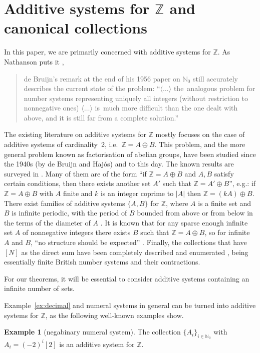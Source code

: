 \documentclass[12pt]{article}
\theoremstyle{definition}
\newtheorem{example}{Example}
\newcommand{\N}{\mathbb{N}}
\newcommand{\Z}{\mathbb{Z}}
\begin{document}
\section{Additive systems for $\Z$ and canonical collections}
\label{sec:canonical}
In this paper, we are primarily concerned with additive systems for $\Z$.
As Nathanson puts it \cite{Nathanson}, 
\begin{quote}
de Bruijn's remark at the end of his 1956 paper on $\N_0$ still accurately describes the current state of the problem: ``$\langle\ldots\rangle$ the~analog\-ous problem for number systems representing uniquely all integers (without restriction to nonnegative ones) $\langle\ldots\rangle$ is~much more difficult than the one dealt with above, and it is still far from a complete solution.''
\end{quote}

The existing literature on additive systems for $\Z$ mostly focuses on the case of additive systems of cardinality~2, i.e.\ $\Z=A\oplus B$. This problem, and the more general problem known as factorisation of abelian groups, have been studied since the 1940s (by de Bruijn and Haj\'os) and to this day. The known results are surveyed in \cite{book:SzaboSands}. Many of them are of the form ``if $\Z=A\oplus B$ and $A,B$ satisfy certain conditions, then there exists another set $A'$ such that $\Z=A'\oplus B$'', e.g.: if $\Z=A\oplus B$ with $A$ finite and $k$ is an integer coprime to $|A|$ then $\Z=(kA)\oplus B$. There exist families of additive systems $\{A,B\}$ for $\Z$, where $A$ is a finite set and $B$ is infinite periodic, with the period of $B$ bounded from above or from below in the terms of the diameter of $A$ \cite{book:SzaboSands}. It is known that for any sparse enough infinite set $A$ of nonnegative integers there exists $B$ such that $\Z=A\oplus B$, so for infinite $A$ and $B$, ``no structure should be expected'' \cite{book:ww}. Finally, the collections that have $[N]$ as the direct sum have been completely described and enumerated \cite{cardiff23}, being essentially finite British number systems and their contractions.

For our theorems, it will be essential to consider additive systems containing an infinite number of sets.

Example~\ref{ex:decimal} and numeral systems in general can be turned into additive systems for $\Z$, as the following well-known examples show.

\begin{example}[negabinary numeral system]
\label{ex:-bin}
The collection $\{A_i\}_{i\in\N_0}$ with $A_i=(-2)^i[2]$ is an additive system for $\Z$.
\end{example}
\end{document}

